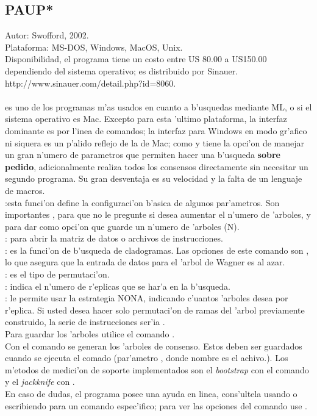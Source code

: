 \subsection{PAUP*}
\noindent
Autor: Swofford, 2002.\\
Plataforma: MS-DOS, Windows, MacOS, Unix.\\
Disponibilidad, el programa tiene un costo entre US 80.00 a US150.00 dependiendo del sistema operativo; es distribuido por Sinauer.\\
http://www.sinauer.com/detail.php?id=8060.
\\
\paragraph*{}
 es uno de los programas m'as usados en cuanto a b'usquedas mediante ML, o si el sistema operativo es Mac. Excepto para esta 'ultimo plataforma, la interfaz dominante es por l'inea de comandos; la interfaz para Windows en modo gr'afico ni siquera es un p'alido reflejo de la de Mac; como  y  tiene la opci'on de manejar un gran n'umero de parametros que permiten hacer una b'usqueda \textbf{sobre pedido}, adicionalmente realiza todos los consensos directamente sin necesitar un segundo programa. Su gran desventaja es su velocidad y la falta de un lenguaje de macros.\\
:esta funci'on define la configuraci'on b'asica de algunos par'ametros. Son importantes , para que no le pregunte si desea aumentar el n'umero de 'arboles, y  para dar como opci'on que guarde un n'umero de 'arboles (N).\\
: para abrir la matriz de datos o archivos de instrucciones.\\
: es la funci'on de b'usqueda de cladogramas. Las opciones de este comando son , lo que asegura que la entrada de datos para el 'arbol de Wagner es al azar.\\
: es el tipo de permutaci'on.\\
: indica el n'umero de r'eplicas que se har'a en la b'usqueda.\\ 
: le permite usar la estrategia NONA, indicando c'uantos 'arboles desea por r'eplica. Si usted desea hacer solo permutaci'on de ramas del 'arbol previamente construido, la serie de instrucciones ser'ia .\\
Para guardar los 'arboles utilice el comando .\\
Con el comando  se generan los 'arboles de consenso. Estos deben ser guardados cuando se ejecuta el comado (par'ametro , donde nombre es el achivo.). Los m'etodos de medici'on de soporte implementados son el \textit{bootstrap} con el comando  y el \textit{jackknife} con .\\
En caso de dudas, el programa posee una ayuda en linea, cons'ultela usando  o escribiendo  para un comando espec'ifico; para ver las opciones del comando use .